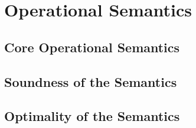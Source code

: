 \section{Operational Semantics}
\subsection{Core Operational Semantics}



\subsection{Soundness of the Semantics}
%


\subsection{Optimality of the Semantics}




